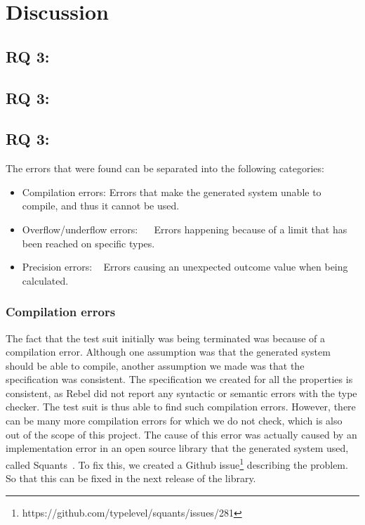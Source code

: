\chapter{Discussion}
\label{cpt:7_discussion}

\section{RQ 3: \rqOne{}}

\section{RQ 3: \rqTwo{}}

\section{RQ 3: \rqThree{}}
The errors that were found can be separated into the following categories:
\begin{itemize}
\item Compilation errors: Errors that make the generated system unable to compile, and thus it cannot be used.
\item Overflow/underflow errors:~ ~ Errors happening because of a limit that has been reached on specific types.
\item Precision errors: ~ Errors causing an unexpected outcome value when being calculated.
\end{itemize}
\subsection*{Compilation errors}
The fact that the test suit initially was being terminated was because of a compilation error. Although one assumption was that the generated system should be able to compile, another assumption we made was that the specification was consistent. The specification we created for all the properties is consistent, as Rebel did not report any syntactic or semantic errors with the type checker. The test suit is thus able to find such compilation errors. However, there can be many more compilation errors for which we do not check, which is also out of the scope of this project. The cause of this error was actually caused by an implementation error in an open source library that the generated system used, called Squants~\cite{siteSquants2017}. To fix this, we created a Github issue\footnote{https://github.com/typelevel/squants/issues/281} describing the problem. So that this can be fixed in the next release of the library.


